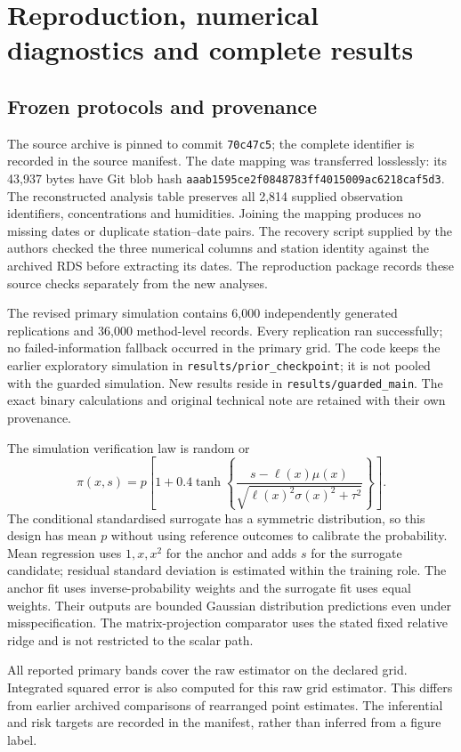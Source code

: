 \section{Reproduction, numerical diagnostics and complete results}
\subsection{Frozen protocols and provenance}
The source archive is pinned to commit \texttt{70c47c5}; the complete identifier is recorded in the source manifest. The date mapping was transferred losslessly: its 43,937 bytes have Git blob hash \texttt{aaab1595ce2f0848783ff4015009ac6218caf5d3}. The reconstructed analysis table preserves all 2,814 supplied observation identifiers, concentrations and humidities. Joining the mapping produces no missing dates or duplicate station--date pairs. The recovery script supplied by the authors checked the three numerical columns and station identity against the archived RDS before extracting its dates. The reproduction package records these source checks separately from the new analyses.

The revised primary simulation contains 6,000 independently generated replications and 36,000 method-level records. Every replication ran successfully; no failed-information fallback occurred in the primary grid. The code keeps the earlier exploratory simulation in \texttt{results/prior\_checkpoint}; it is not pooled with the guarded simulation. New results reside in \texttt{results/guarded\_main}. The exact binary calculations and original technical note are retained with their own provenance.

The simulation verification law is random or
\[
 \pi(x,s)=p\left[1+0.4\tanh\left\{
 \frac{s-\ell(x)\mu(x)}{\sqrt{\ell(x)^2\sigma(x)^2+\tau^2}}
 \right\}\right].
\]
The conditional standardised surrogate has a symmetric distribution, so this design has mean $p$ without using reference outcomes to calibrate the probability. Mean regression uses $1,x,x^2$ for the anchor and adds $s$ for the surrogate candidate; residual standard deviation is estimated within the training role. The anchor fit uses inverse-probability weights and the surrogate fit uses equal weights. Their outputs are bounded Gaussian distribution predictions even under misspecification. The matrix-projection comparator uses the stated fixed relative ridge and is not restricted to the scalar path.

All reported primary bands cover the raw estimator on the declared grid. Integrated squared error is also computed for this raw grid estimator. This differs from earlier archived comparisons of rearranged point estimates. The inferential and risk targets are recorded in the manifest, rather than inferred from a figure label.


